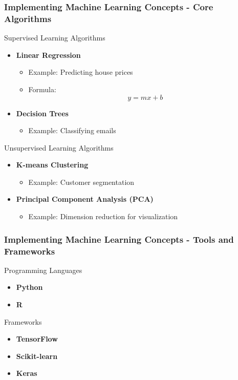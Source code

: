 \documentclass{beamer}
\begin{document}
\begin{frame}[fragile]
    \frametitle{Implementing Machine Learning Concepts - Core Algorithms}
    \begin{block}{Supervised Learning Algorithms}
        \begin{itemize}
            \item \textbf{Linear Regression}
              \begin{itemize}
                \item Example: Predicting house prices
                \item Formula: 
                \[
                y = mx + b
                \]
              \end{itemize}
            \item \textbf{Decision Trees}
              \begin{itemize}
                \item Example: Classifying emails
              \end{itemize}
        \end{itemize}
    \end{block}
    \begin{block}{Unsupervised Learning Algorithms}
        \begin{itemize}
            \item \textbf{K-means Clustering}
              \begin{itemize}
                \item Example: Customer segmentation
              \end{itemize}
            \item \textbf{Principal Component Analysis (PCA)}
              \begin{itemize}
                \item Example: Dimension reduction for visualization
              \end{itemize}
        \end{itemize}
    \end{block}
\end{frame}

\begin{frame}[fragile]
    \frametitle{Implementing Machine Learning Concepts - Tools and Frameworks}
    \begin{block}{Programming Languages}
        \begin{itemize}
            \item \textbf{Python}
            \item \textbf{R}
        \end{itemize}
    \end{block}
    \begin{block}{Frameworks}
        \begin{itemize}
            \item \textbf{TensorFlow}
            \item \textbf{Scikit-learn}
            \item \textbf{Keras}
        \end{itemize}
    \end{block}
\end{frame}
\end{document}
